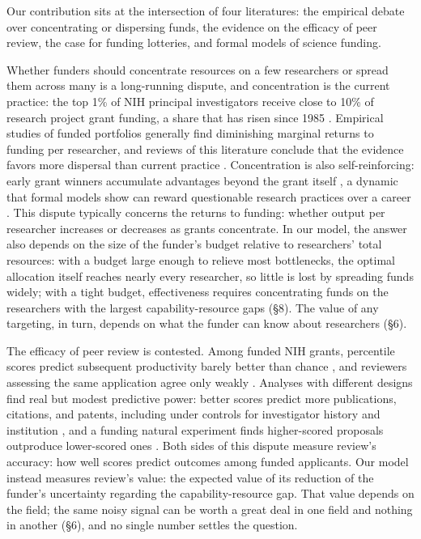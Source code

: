 \documentclass[article, 11pt, reqno]{amsart}
\theoremstyle{named}
\begin{document}
Our contribution sits at the intersection of four literatures: the empirical debate over
concentrating or dispersing funds, the evidence on the efficacy of peer review, the case
for funding lotteries, and formal models of science funding.

Whether funders should concentrate resources on a few researchers or spread them across
many is a long-running dispute, and concentration is the current practice: the top 1\% of
NIH principal investigators receive close to 10\% of research project grant funding, a
share that has risen since 1985 \citep{KatzMatter2020, Lauer2021}. Empirical studies of
funded portfolios generally find diminishing marginal returns to funding per researcher,
and reviews of this literature conclude that the evidence favors more dispersal than
current practice \citep{Mongeon2016, Aagaard2020}. Concentration is also self-reinforcing:
early grant winners accumulate advantages beyond the grant itself \citep{BolVaanRijt2018},
a dynamic that formal models show can reward questionable research practices over a career
\citep{Heesen2024}.
This dispute typically concerns the returns to funding: whether output per researcher increases
or decreases as grants concentrate. In our model, the answer also depends on the size of the
funder's budget relative to researchers' total resources: with a budget large enough to
relieve most bottlenecks, the optimal allocation itself reaches nearly every researcher, so
little is lost by spreading funds widely; with a tight budget, effectiveness requires
concentrating funds on the researchers with the largest capability-resource gaps (\S8).
The value of any targeting, in turn, depends on what the funder can know about researchers
(\S6).

The efficacy of peer review is contested. Among funded NIH grants, percentile scores
predict subsequent productivity barely better than chance \citep{Fang2016}, and reviewers
assessing the same application agree only weakly \citep{Pier2018}. Analyses with different
designs find real but modest predictive power: better scores predict more publications,
citations, and patents, including under controls for investigator history and institution
\citep{LiAgha2015}, and a funding natural experiment finds higher-scored proposals
outproduce lower-scored ones \citep{ParkLeeKim2015}. Both sides of this dispute measure
review's accuracy: how well scores predict outcomes among funded applicants. Our model
instead measures review's value: the expected value of its reduction of the funder's
uncertainty regarding the capability-resource gap. That value depends on the field; the same noisy signal can be
worth a great deal in one field and nothing in another (\S6), and no single number settles
the question.
\end{document}
